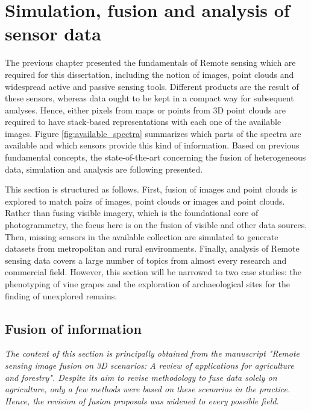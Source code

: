 \setchapterpreamble[u]{\margintoc}
\chapter{Simulation, fusion and analysis of sensor data}
\label{sec:context_rs}

The previous chapter presented the fundamentals of \gls{Remote sensing} which are required for this dissertation, including the notion of images, point clouds and widespread active and passive sensing tools. Different products are the result of these sensors, whereas data ought to be kept in a compact way for subsequent analyses. Hence, either pixels from maps or points from 3D point clouds are required to have stack-based representations with each one of the available images. Figure \ref{fig:available_spectra} summarizes which parts of the spectra are available and which sensors provide this kind of information. Based on previous fundamental concepts, the state-of-the-art concerning the fusion of heterogeneous data, simulation and analysis are following presented.

This section is structured as follows. First, fusion of images and point clouds is explored to match pairs of images, point clouds or images and point clouds. Rather than fusing visible imagery, which is the foundational core of photogrammetry, the focus here is on the fusion of visible and other data sources. Then, missing sensors in the available collection are simulated to generate datasets from metropolitan and rural environments. Finally, analysis of \gls{Remote sensing} data covers a large number of topics from almost every research and commercial field. However, this section will be narrowed to two case studies: the phenotyping of vine grapes and the exploration of archaeological sites for the finding of unexplored remains.

\section{Fusion of information}

\textit{The content of this section is principally obtained from the manuscript "Remote sensing image fusion on 3D scenarios: A review of applications for agriculture and forestry". Despite its aim to revise methodology to fuse data solely on agriculture, only a few methods were based on these scenarios in the practice. Hence, the revision of fusion proposals was widened to every possible field.} 

